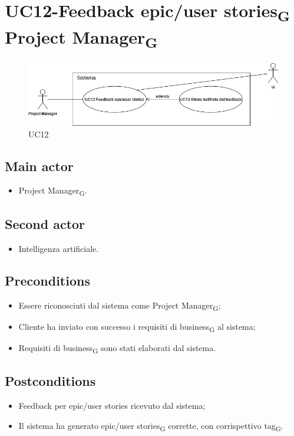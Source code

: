 \documentclass{article}
\begin{document}
\section{UC12-Feedback epic/user stories\textsubscript{G} Project Manager\textsubscript{G}}
    \begin{figure}[h]
      \centering
      \includegraphics[width=.8\textwidth, height=.6\textheight, keepaspectratio]{documenti/imgUML/UC12-FEEDBACK-EPIC-USER-STORIES-PROJECT-MANAGER.drawio.png}
    \caption{UC12}      
      \label{fig:UC12}
    \end{figure}
    \subsection*{Main actor}
    \begin{itemize}
        \item Project Manager\textsubscript{G}.
    \end{itemize}
    \subsection*{Second actor}
    \begin{itemize}
        \item Intelligenza artificiale.
    \end{itemize}
    
    \subsection*{Preconditions}
        \begin{itemize}
            \item Essere riconosciuti dal sistema come Project Manager\textsubscript{G};
            \item Cliente ha inviato con successo i requisiti di business\textsubscript{G} al sistema;
            \item Requisiti di business\textsubscript{G} sono stati elaborati dal sistema.
        \end{itemize}
        
    \subsection*{Postconditions}
        \begin{itemize}
            \item Feedback per epic/user stories ricevuto dal sistema;
            \item Il sistema ha generato epic/user stories\textsubscript{G} corrette, con corrispettivo tag\textsubscript{G}.
        \end{itemize}
        
\end{document}
